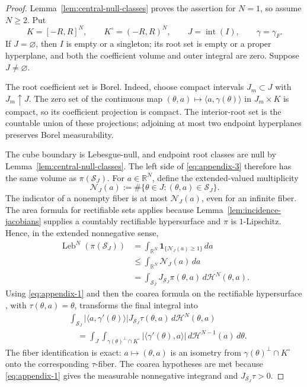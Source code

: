 \begin{proof}
Lemma~\ref{lem:central-null-classes} proves the assertion for $N=1$, so
assume $N\geq2$.  Put
\[
K=[-R,R]^N,
\qquad K^\circ=(-R,R)^N,
\qquad J=\operatorname{int}(I),
\qquad \gamma=\gamma_F.
\]
If $J=\varnothing$, then $I$ is empty or a singleton; its root set is empty
or a proper hyperplane, and both the coefficient volume and outer integral
are zero.  Suppose $J\neq\varnothing$.

The root coefficient set is Borel.  Indeed, choose compact intervals
$J_m\subset J$ with $J_m\uparrow J$.  The zero set of the continuous map
$(\theta,a)\mapsto\langle a,\gamma(\theta)\rangle$ in $J_m\times K$ is
compact, so its coefficient projection is compact.  The interior-root set is
the countable union of these projections; adjoining at most two endpoint
hyperplanes preserves Borel measurability.

The cube boundary is Lebesgue-null, and endpoint root classes are null by
Lemma~\ref{lem:central-null-classes}.  The left side of \eqref{eq:appendix-3} therefore has
the same volume as $\pi(\mathcal S_J)$.  For $a\in\mathbb R^N$, define the
extended-valued multiplicity
\[
\mathcal N_J(a)
:=\#\{\theta\in J:(\theta,a)\in\mathcal S_J\}.
\]
The indicator of a nonempty fiber is at most $\mathcal N_J(a)$, even for an
infinite fiber.  The area formula for rectifiable sets
\citep{federer1969gmt} applies because
Lemma~\ref{lem:incidence-jacobians} supplies a countably rectifiable
hypersurface and $\pi$ is $1$-Lipschitz.  Hence, in the extended nonnegative
sense,
\begin{equation}
\begin{aligned}
\operatorname{Leb}^N(\pi(\mathcal S_J))
&=\int_{\mathbb R^N}
  \mathbf1_{\{\mathcal N_J(a)\geq1\}}\,da\\
&\leq\int_{\mathbb R^N}\mathcal N_J(a)\,da\\
&=\int_{\mathcal S_J}
  J_{\mathcal S_J}\pi(\theta,a)\,d\mathcal H^N(\theta,a).
\end{aligned}
\label{eq:appendix-4}
\end{equation}
Using \eqref{eq:appendix-1} and then the coarea formula on the rectifiable hypersurface
\citep{federer1969gmt}, with $\tau(\theta,a)=\theta$, transforms the final
integral into
\begin{equation}
\begin{aligned}
&\int_{\mathcal S_J}
 |\langle a,\gamma'(\theta)\rangle|
 J_{\mathcal S_J}\tau(\theta,a)
 \,d\mathcal H^N(\theta,a)\\
&\quad=
\int_J\int_{\gamma(\theta)^\perp\cap K^\circ}
 |\langle\gamma'(\theta),a\rangle|
 \,d\mathcal H^{N-1}(a)\,d\theta.
\end{aligned}
\label{eq:appendix-5}
\end{equation}
The fiber identification is exact: $a\mapsto(\theta,a)$ is an isometry from
$\gamma(\theta)^\perp\cap K^\circ$ onto the corresponding $\tau$-fiber.
The coarea hypotheses are met because \eqref{eq:appendix-1} gives the measurable
nonnegative integrand and $J_{\mathcal S_J}\tau>0$.


\end{proof}
